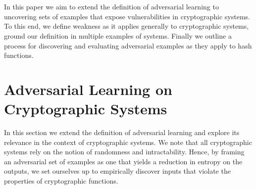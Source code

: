 \documentclass[letterpaper,twocolumn,10pt]{article}
\begin{document}
\\
\\
In this paper we aim to extend the definition of adversarial learning to uncovering sets of examples that expose vulnerabilities in cryptographic systems. To this end, we define weakness as it applies generally to cryptographic systems, ground our definition in multiple examples of systems. Finally we outline a process for discovering and evaluating adversarial examples as they apply to hash functions. 

\section{Adversarial Learning on Cryptographic Systems} \label{cryptosys}

In this section we extend the definition of adversarial learning and explore its relevance in the context of cryptographic systems. We note that all cryptographic systems rely on the notion of randomness and intractability. Hence, by framing an adversarial set of examples as one that yields a reduction in entropy on the outputs, we set ourselves up to empirically discover inputs that violate the properties of cryptographic functions. 
\end{document}
